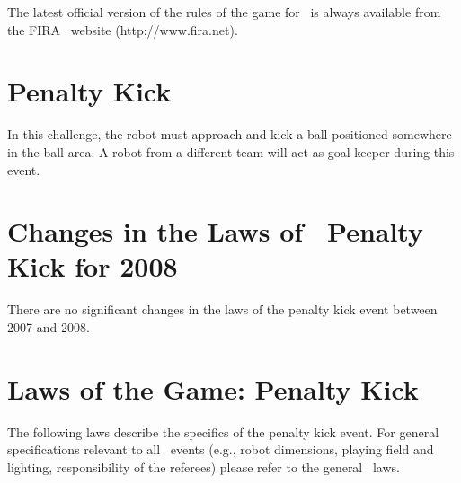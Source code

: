 \documentclass[12pt]{hurocup}
\begin{document}
The latest official version of the rules of the game for \HuroCup\ is
always available from the FIRA \HuroCup\ website (http://www.fira.net).

\newpage

\section{Penalty Kick}
\label{sec:penalty-kick}

In this challenge, the robot must approach and kick a ball positioned
somewhere in the ball area. A robot from a different team will act as
goal keeper during this event.

\section{Changes in the Laws of \HuroCup\ Penalty Kick for 2008}

There are no significant changes in the laws of the penalty kick event
between 2007 and 2008.

\section{Laws of the Game: Penalty Kick}
\label{sec:laws-penalty-kicks}

The following laws describe the specifics of the penalty kick event. For
general specifications relevant to all \HuroCup\ events (e.g., robot
dimensions, playing field and lighting, responsibility of the
referees) please refer to the general \HuroCup\ laws.

\label{pk-field}
\end{document}
